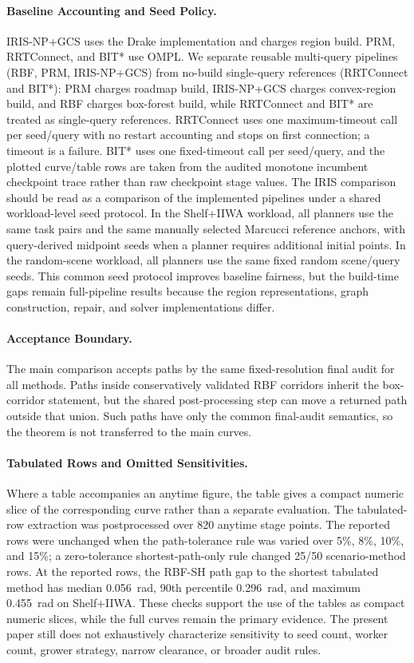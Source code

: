 \documentclass[journal]{IEEEtran}
\DeclareRobustCommand{\textsc}[1]{\textnormal{\MakeUppercase{#1}}}
\newcommand{\rbf}{\textsc{RBF}}
\begin{document}
\paragraph{Baseline Accounting and Seed Policy.}
IRIS-NP+GCS uses the Drake implementation and charges region build. PRM,
RRTConnect, and BIT* use OMPL. We separate reusable multi-query pipelines
(\rbf{}, PRM, IRIS-NP+GCS) from no-build single-query references (RRTConnect
and BIT*): PRM charges roadmap build, IRIS-NP+GCS charges convex-region build,
and \rbf{} charges box-forest build, while RRTConnect and BIT* are treated as
single-query references. RRTConnect uses one
maximum-timeout call per seed/query with no restart accounting and stops on
first connection; a timeout is a failure. BIT* uses one fixed-timeout call per
seed/query, and the plotted curve/table rows are taken from the audited monotone
incumbent checkpoint trace rather than raw checkpoint stage values. The IRIS
comparison should be read as a comparison of the implemented pipelines under a
shared workload-level seed protocol. In the Shelf+IIWA workload, all planners
use the same task pairs and the same manually selected Marcucci reference
anchors, with query-derived midpoint seeds when a planner requires additional
initial points. In the random-scene workload, all planners use the same fixed
random scene/query seeds. This common seed protocol improves baseline fairness,
but the build-time gaps remain full-pipeline results because the region
representations, graph construction, repair, and solver implementations differ.

\paragraph{Acceptance Boundary.}
The main comparison accepts paths by the same fixed-resolution final audit for
all methods. Paths inside conservatively validated \rbf{} corridors inherit the
box-corridor statement, but the shared post-processing step can move a returned
path outside that union. Such paths have only the common final-audit semantics,
so the theorem is not transferred to the main curves.

\paragraph{Tabulated Rows and Omitted Sensitivities.}
Where a table accompanies an anytime figure, the table gives a compact numeric
slice of the corresponding curve rather than a separate evaluation. The
tabulated-row extraction was postprocessed over 820 anytime stage points. The
reported rows were unchanged when the path-tolerance rule was varied over
5\%, 8\%, 10\%, and 15\%; a zero-tolerance shortest-path-only rule changed
25/50 scenario-method rows. At the reported rows, the RBF-SH path gap to the
shortest tabulated method has median 0.056~rad, 90th percentile 0.296~rad, and
maximum 0.455~rad on Shelf+IIWA. These checks support the use of the tables as
compact numeric slices, while the full curves remain the primary evidence.
The present paper still does not exhaustively characterize sensitivity to seed
count, worker count, grower strategy, narrow clearance, or broader audit rules.
\end{document}
